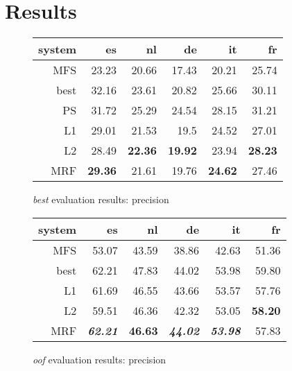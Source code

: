 \documentclass[11pt,letterpaper]{article}
\begin{document}
\section{Results}
\begin{figure*}[th!]
\begin{subfigure}[t]{0.55\textwidth}
  \begin{tabular}{|r|r|r|r|r|r|}
    \hline
    system   & es    & nl    & de    &  it   & fr \\
    \hline
 MFS  & 23.23          & 20.66          & 17.43          & 20.21          & 25.74 \\
 best & 32.16          & 23.61          & 20.82          & 25.66          & 30.11 \\
   PS & 31.72 & 25.29 & 24.54 & 28.15 & 31.21 \\
    \hline
          L1 & 29.01          & 21.53          & 19.5           & 24.52          & 27.01 \\
          L2 & 28.49          & \textbf{22.36} & \textbf{19.92} & 23.94          & \textbf{28.23} \\
         MRF & \textbf{29.36} & 21.61          & 19.76          & \textbf{24.62} & 27.46 \\
    \hline
  \end{tabular}
\caption{\emph{best} evaluation results: precision}
\label{table:resultsbest}
\end{subfigure}
%
\begin{subfigure}[t]{0.4\textwidth}
    \begin{tabular}{|r|r|r|r|r|r|}
      \hline
      system   & es    & nl    & de    &  it   & fr \\
      \hline
    MFS & 53.07          & 43.59              & 38.86          & 42.63          & 51.36 \\
   best & 62.21          & 47.83              & 44.02          & 53.98          & 59.80 \\
      \hline
           L1  & 61.69          & 46.55              & 43.66          & 53.57          & 57.76 \\
           L2  & 59.51          & 46.36              & 42.32          & 53.05          & \textbf{58.20} \\
           MRF & \textit{\textbf{62.21}}& \textbf{46.63} & \textit{\textbf{44.02}}& \textit{\textbf{53.98}} & 57.83 \\
      \hline
    \end{tabular}
\caption{\emph{oof} evaluation results: precision}
\label{table:resultsoof}
\end{subfigure}


\end{figure*}
\end{document}
